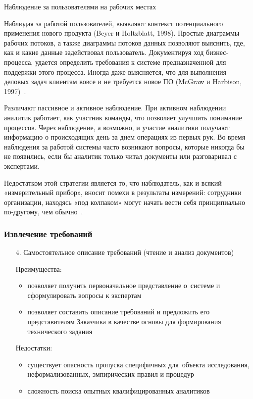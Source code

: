 \documentclass{../industrial-development}
\begin{document}
\lecturenotes

\alert{Наблюдение за пользователями на рабочих местах}

Наблюдая за работой пользователей, выявляют контекст потенциального применения нового продукта (Beyer и Holtzblatt, 1998). Простые диаграммы рабочих потоков, а также диаграммы потоков данных позволяют выяснить, где, как и какие данные задействовал пользователь. Документируя ход бизнес-процесса, удается определить требования к системе предназначенной для поддержки этого процесса. Иногда даже выясняется, что для выполнения деловых задач клиентам вовсе и не требуется новое ПО (McGraw и Harbison, 1997)~\cite[с.~47]{Wiegers}.

Различают пассивное и активное наблюдение. При активном наблюдении аналитик работает, как участник команды, что позволяет улучшить понимание процессов. Через наблюдение, а возможно, и участие аналитики получают информацию о происходящих день за днем операциях из первых рук. Во время наблюдения за работой системы часто возникают вопросы, которые никогда бы не появились, если бы аналитик только читал документы или разговаривал с экспертами.

Недостатком этой стратегии является то, что наблюдатель, как и всякий «измерительный прибор», вносит помехи в результаты измерений: сотрудники организации, находясь «под колпаком» могут начать вести себя принципиально по-другому, чем обычно~\cite[с.~32]{Maglinec}.


\begin{frame} \frametitle{Извлечение требований}
\begin{itemize}

\item[4.] Самостоятельное описание требований (чтение и анализ документов)

Преимущества:
\begin{itemize} 
\item позволяет получить первоначальное представление о~системе и сформулировать вопросы к экспертам
\item позволяет составить описание требований и предложить его представителям Заказчика в качестве основы для формирования технического задания
\end{itemize}
Недостатки:
\begin{itemize}
\item существует опасность пропуска специфичных для~объекта исследования, неформализованных, эмпирических правил и процедур
\item сложность поиска опытных квалифицированных аналитиков
\end{itemize}
\end{itemize}
\end{frame}
\end{document}
